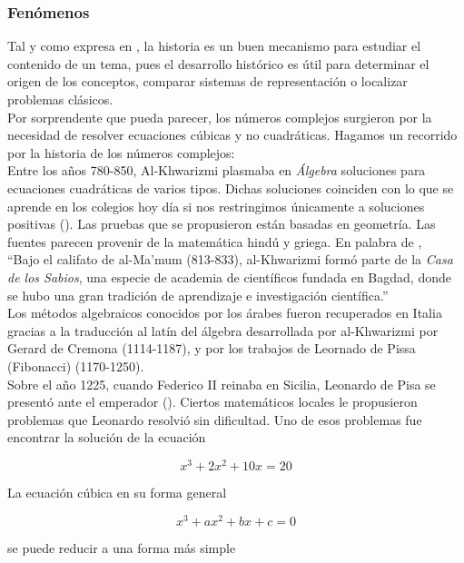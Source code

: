 \documentclass[../main.tex]{memoir}
\begin{document}
\subsubsection{Fenómenos}

Tal y como expresa \cite{lupi2013} en \cite{rico2013}, la historia es un buen mecanismo para estudiar el contenido de un tema, pues el desarrollo histórico es útil para determinar el origen de los conceptos, comparar sistemas de representación o localizar problemas clásicos. \\

Por sorprendente que pueda parecer, los números complejos surgieron por la necesidad de resolver ecuaciones cúbicas y no cuadráticas. Hagamos un recorrido por la historia de los números complejos: \\

Entre los años 780-850, Al-Khwarizmi plasmaba en \textit{Álgebra} soluciones para ecuaciones cuadráticas de varios tipos. Dichas soluciones coinciden con lo que se aprende en los colegios hoy día si nos restringimos únicamente a soluciones positivas (\cite{waerden1985}). Las pruebas que se propusieron están basadas en geometría. Las fuentes parecen provenir de la matemática hindú y griega. En palabra de \cite{waerden1985}, \\

``Bajo el califato de al-Ma'mum (813-833), al-Khwarizmi formó parte de la \textit{Casa de los Sabios}, una especie de academia de científicos fundada en Bagdad, donde se hubo una gran tradición de aprendizaje e investigación científica.'' \\

Los métodos algebraicos conocidos por los árabes fueron recuperados en Italia gracias a la traducción al latín del álgebra desarrollada por al-Khwarizmi por Gerard de Cremona (1114-1187), y por los trabajos de Leornado de Pissa (Fibonacci) (1170-1250). \\

Sobre el año 1225, cuando Federico II reinaba en Sicilia, Leonardo de Pisa se presentó ante el emperador (\cite{nahin1998}). Ciertos matemáticos locales le propusieron problemas que Leonardo resolvió sin dificultad. Uno de esos problemas fue encontrar la solución de la ecuación

$$x^3+2x^2+10x=20$$

La ecuación cúbica en su forma general

$$ x^3+ax^2+bx+c = 0$$

se puede reducir a una forma más simple
\end{document}
